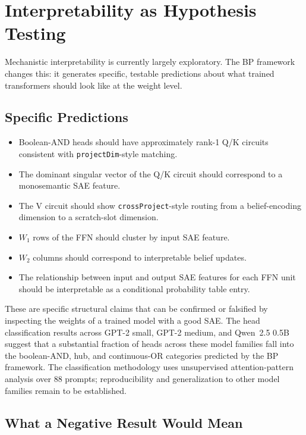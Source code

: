 \section{Interpretability as Hypothesis Testing}
\label{sec:interp-hypothesis}

Mechanistic interpretability is currently largely exploratory. The BP
framework changes this: it generates specific, testable predictions about
what trained transformers should look like at the weight level.

\subsection*{Specific Predictions}

\begin{itemize}
\item Boolean-AND heads should have approximately rank-1 Q/K circuits
consistent with \texttt{projectDim}-style matching.
\item The dominant singular vector of the Q/K circuit should correspond to
a monosemantic SAE feature.
\item The V circuit should show \texttt{crossProject}-style routing from a
belief-encoding dimension to a scratch-slot dimension.
\item $W_1$ rows of the FFN should cluster by input SAE feature.
\item $W_2$ columns should correspond to interpretable belief updates.
\item The relationship between input and output SAE features for each FFN
unit should be interpretable as a conditional probability table entry.
\end{itemize}

These are specific structural claims that can be confirmed or falsified by
inspecting the weights of a trained model with a good SAE. The head
classification results across GPT-2 small, GPT-2 medium, and Qwen~2.5 0.5B
suggest that a substantial fraction of heads across these model families
fall into the boolean-AND, hub, and continuous-OR categories predicted by
the BP framework. The classification methodology uses unsupervised
attention-pattern analysis over 88 prompts; reproducibility and
generalization to other model families remain to be established.

\subsection*{What a Negative Result Would Mean}

